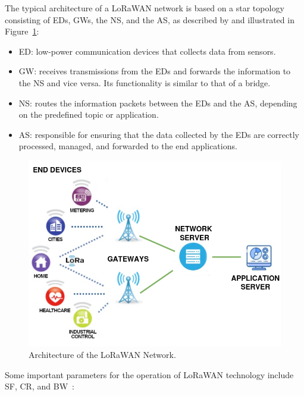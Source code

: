 \documentclass[a4paper,fleqn]{cas-dc}
\begin{document}
The typical architecture of a \gls{LoRaWAN} network is based on a star topology consisting of \gls{EDs}, \gls{GWs}, the \gls{NS}, and the \gls{AS}, as described by \cite{delgado2022lorawan} and illustrated in Figure~\ref{fig:lorawan-arch}:

\begin{itemize}
    \item ED: low-power communication devices that collects data from sensors.
    \item GW: receives transmissions from the \gls{EDs} and forwards the information to the \gls{NS} and vice versa. Its functionality is similar to that of a bridge.
    \item \gls{NS}: routes the information packets between the \gls{EDs} and the \gls{AS}, depending on the predefined topic or application.
    \item \gls{AS}: responsible for ensuring that the data collected by the \gls{EDs} are correctly processed, managed, and forwarded to the end applications.
\end{itemize}

\begin{figure}[ht]
    \centering
    \includegraphics[width=0.98\linewidth]{imgs/lorawan.png}
    \caption{Architecture of the \gls{LoRaWAN} Network.}
    \label{fig:lorawan-arch}
\end{figure}

Some important parameters for the operation of \gls{LoRaWAN} technology include \gls{SF}, \gls{CR}, and \gls{BW}~\cite{al2024lpwan}:
\end{document}
